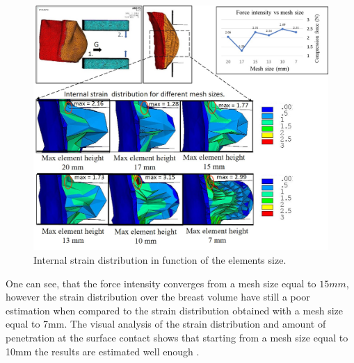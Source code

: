 \begin{figure}[!h]
\centering
\includegraphics[width=\textwidth,keepaspectratio]{figures/meshConvergence.jpg} 
\caption{Internal strain distribution in function of the elements size. }\label{fig:meshconvergence}
\end{figure}

One can see, that the force intensity converges from a mesh size equal to $15mm$, however the strain distribution over the breast volume have still a poor estimation when compared to the strain distribution obtained with a mesh size equal to 7mm. The visual analysis of the strain distribution and amount of penetration at the surface contact  shows that starting from a mesh size equal to 10mm the results are estimated well enough . 